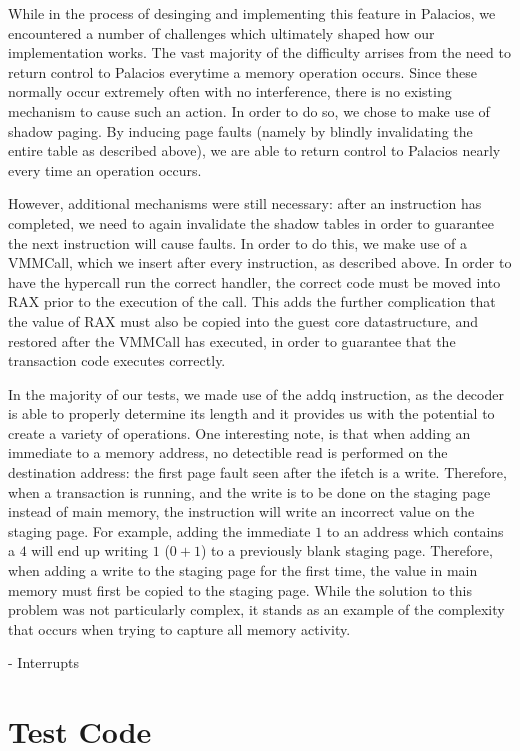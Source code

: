\documentclass{acm_proc_article-sp}
\begin{document}
While in the process of desinging and implementing this feature in Palacios, we
encountered a number of challenges which ultimately shaped how our implementation
works. The vast majority of the difficulty arrises from the need to return
control to Palacios everytime a memory operation occurs. Since these normally
occur extremely often with no interference, there is no existing mechanism to 
cause such an action. In order to do so, we chose to make use of shadow paging.
By inducing page faults (namely by blindly invalidating the entire table as
described above), we are able to return control to Palacios nearly every time
an operation occurs.

However, additional mechanisms were still necessary: after an instruction has
completed, we need to again invalidate the shadow tables in order to guarantee 
the next instruction will cause faults. In order to do this, we make use of a 
VMMCall, which we insert after every instruction, as described above. In order
to have the hypercall run the correct handler, the correct code must be moved
into RAX prior to the execution of the call. This adds the further complication
that the value of RAX must also be copied into the guest core datastructure,
and restored after the VMMCall has executed, in order to guarantee that the 
transaction code executes correctly.  

In the majority of our tests, we made use of the addq instruction, as the 
decoder is able to properly determine its length and it provides us with the
potential to create a variety of operations. One interesting note, is that when
adding an immediate to a memory address, no detectible read is performed on
the destination address: the first page fault seen after the ifetch is a write.
Therefore, when a transaction is running, and the write is to be done on the
staging page instead of main memory, the instruction will write an incorrect
value on the staging page. For example, adding the immediate $1$ to an address
which contains a $4$ will end up writing $1$ ($0+1$) to a previously blank
staging page. Therefore, when adding a write to the staging page for the first
time, the value in main memory must first be copied to the staging page. While
the solution to this problem was not particularly complex, it stands as an 
example of the complexity that occurs when trying to capture all memory 
activity.
 
- Interrupts

\section{Test Code}
\end{document}
